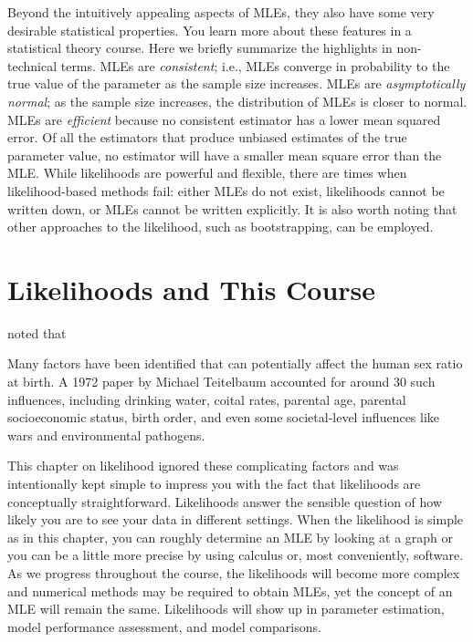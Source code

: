 \documentclass[
]{krantz}
\renewenvironment{quote}{\begin{VF}}{\end{VF}}
\begin{document}
Beyond the intuitively appealing aspects of MLEs, they also have some very desirable statistical properties. You learn more about these features in a statistical theory course. Here we briefly summarize the highlights in non-technical terms. MLEs are \emph{consistent}; i.e., MLEs converge in probability to the true value of the parameter as the sample size increases. MLEs are \emph{asymptotically normal}; as the sample size increases, the distribution of MLEs is closer to normal. MLEs are \emph{efficient} because no consistent estimator has a lower mean squared error. Of all the estimators that produce unbiased estimates of the true parameter value, no estimator will have a smaller mean square error than the MLE. While likelihoods are powerful and flexible, there are times when likelihood-based methods fail: either MLEs do not exist, likelihoods cannot be written down, or MLEs cannot be written explicitly. It is also worth noting that other approaches to the likelihood, such as bootstrapping, can be employed.

\section{Likelihoods and This Course}\label{likelihoods-and-this-course}

\citet{Rodgers2001} noted that

\begin{quote}
Many factors have been identified that can potentially affect the human sex
ratio at birth. A 1972 paper by Michael Teitelbaum accounted for around 30
such influences, including drinking water, coital rates, parental age, parental
socioeconomic status, birth order, and even some societal-level influences like
wars and environmental pathogens.
\end{quote}

This chapter on likelihood ignored these complicating factors and was intentionally kept simple to impress you with the fact that likelihoods are conceptually straightforward. Likelihoods answer the sensible question of how likely you are to see your data in different settings. When the likelihood is simple as in this chapter, you can roughly determine an MLE by looking at a graph or you can be a little more precise by using calculus or, most conveniently, software. As we progress throughout the course, the likelihoods will become more complex and numerical methods may be required to obtain MLEs, yet the concept of an MLE will remain the same. Likelihoods will show up in parameter estimation, model performance assessment, and model comparisons.
\end{document}
